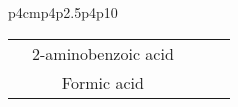 \begin{landscape}
\begin{small}
\begin{longtable}{p{4cm}p{}p{}p{}p10}
\begin{tabular}{c|c|c|c|c}
                                                                                                 & 2-aminobenzoic acid                                                                                   &                                                                                                      &                                                                                              &                                                                                                                                                                                                                                                                                                                                                                                                                                                                                                                                                                                                                                                                                                                                                                                                                                                                                                                           \\
                                                                                                 & Formic acid                                                                                           &                                                                                                      &                                                                                              &                                                                                                                                                                                                                                                                                                                                                                                                                                                                                                                                                                                                                                                                                                                                                                                                                                                                                                                           \\

\end{tabular}
\end{longtable}
\end{small}
\end{landscape}
